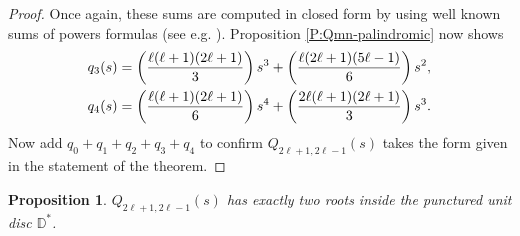 \documentclass[letterpaper,11pt,reqno]{amsart}
\theoremstyle{plain}
\newtheorem{proposition}[equation]{Proposition}
\theoremstyle{definition}
\theoremstyle{remark}
\theoremstyle{remark}
\numberwithin{equation}{section}
\newcommand{\D}{{\mathbb D}}
\begin{document}
\begin{proof}
Once again, these sums are computed in closed form by using well known sums of powers formulas (see e.g. \cite{GrKuPa94}).
Proposition \ref{P:Qmn-palindromic} now shows
\begin{align}
q_3(s) &= \left(\frac{\ell(\ell+1)(2\ell+1)}{3}\right) s^3 + \left( \frac{\ell(2\ell+1)(5\ell-1)}{6} \right) s^2, \notag \\
q_4(s) &= \left( \frac{\ell(\ell+1)(2\ell+1)}{6} \right) s^4 + \left(\frac{2 \ell(\ell+1)(2\ell+1)}{3} \right) s^3. \notag
\end{align}
Now add $q_0+q_1+q_2+q_3+q_4$ to confirm $Q_{2\ell+1,2\ell-1}(s)$ takes the form given in the statement of the theorem.
\end{proof}

\begin{proposition}\label{P:k=2-double-root}
$Q_{2\ell+1,2\ell-1}(s)$ has exactly two roots inside the punctured unit disc $\D^*$.
\end{proposition}
\end{document}
